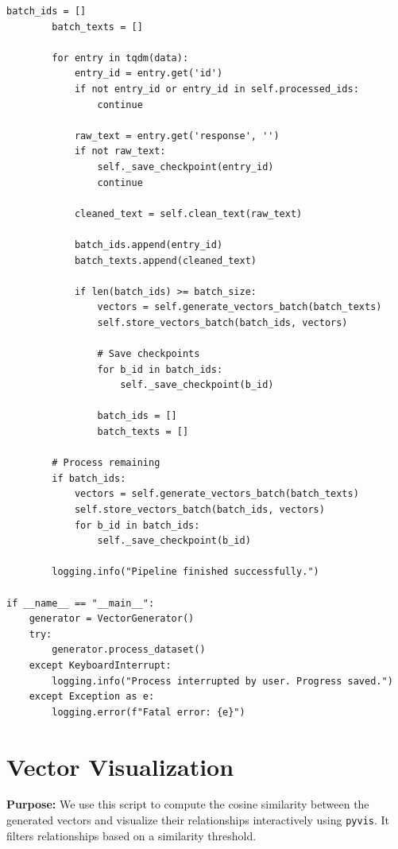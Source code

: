 \documentclass[11pt]{article}
\begin{document}
\begin{lstlisting}[style=pythoncode, caption={vector\_generator.py}]
        batch_ids = []
        batch_texts = []
        
        for entry in tqdm(data):
            entry_id = entry.get('id')
            if not entry_id or entry_id in self.processed_ids:
                continue
                
            raw_text = entry.get('response', '')
            if not raw_text:
                self._save_checkpoint(entry_id)
                continue
                
            cleaned_text = self.clean_text(raw_text)
            
            batch_ids.append(entry_id)
            batch_texts.append(cleaned_text)
            
            if len(batch_ids) >= batch_size:
                vectors = self.generate_vectors_batch(batch_texts)
                self.store_vectors_batch(batch_ids, vectors)
                
                # Save checkpoints
                for b_id in batch_ids:
                    self._save_checkpoint(b_id)
                    
                batch_ids = []
                batch_texts = []
                
        # Process remaining
        if batch_ids:
            vectors = self.generate_vectors_batch(batch_texts)
            self.store_vectors_batch(batch_ids, vectors)
            for b_id in batch_ids:
                self._save_checkpoint(b_id)
            
        logging.info("Pipeline finished successfully.")

if __name__ == "__main__":
    generator = VectorGenerator()
    try:
        generator.process_dataset()
    except KeyboardInterrupt:
        logging.info("Process interrupted by user. Progress saved.")
    except Exception as e:
        logging.error(f"Fatal error: {e}")
\end{lstlisting}


\section{Vector Visualization} \label{sec:visualize}
\textbf{Purpose:} We use this script to compute the cosine similarity between the generated vectors and visualize their relationships interactively using \texttt{pyvis}. It filters relationships based on a similarity threshold.
\end{document}
